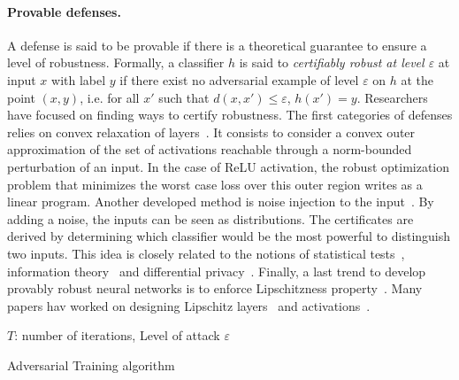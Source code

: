 \paragraph{Provable defenses.} A defense is said to be provable if there is a theoretical guarantee to ensure a level of robustness. Formally, a classifier $h$ is said to \emph{certifiably robust at level $\varepsilon$} at input $x$ with label $y$ if there exist no adversarial example of level $\varepsilon$ on $h$ at the point $(x,y)$, i.e. for all $x'$ such that $d(x,x')\leq\varepsilon$, $h(x') = y$. Researchers have focused on finding ways to certify robustness. The first categories of defenses relies on convex relaxation of layers~\citep{wong2018provable,wong2018scaling}. It consists to consider a convex outer approximation of the set of activations reachable through a norm-bounded perturbation of an input. In the case of ReLU activation, the robust optimization problem  that minimizes the worst case loss over this outer region writes as a linear program. Another developed method is noise injection to the input~\citep{lecuyer2019certified,KolterRandomizedSmoothing,pinot2019theoretical,salman2019provably}. By adding a noise, the inputs can be seen as distributions. The certificates are derived by determining which classifier would be the most powerful to distinguish two inputs. This idea is closely related to the notions of statistical tests~\citep{KolterRandomizedSmoothing}, information theory~\citep{pinot2019theoretical} and differential privacy~\citep{lecuyer2018certified}. Finally, a last trend to develop provably robust neural networks is to enforce Lipschitzness property~\citep{tsuzuku2018lipschitz}. Many papers hav worked on designing Lipschitz layers~\citep{li2019preventing,trockman2021orthogonalizing,skew2021sahil,xxx} and activations~\citep{anil2019sorting,singla2021householder,huang2021local}.


\begin{algorithm}[h!]
  \SetAlgoLined
  $T$: number of iterations, Level of attack $\varepsilon$ \\
   \caption{Adversarial Training algorithm}
   \label{algo:advtraining}
\end{algorithm}
  

